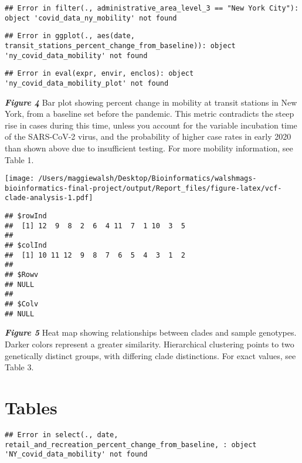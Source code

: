 \documentclass[
]{article}
\begin{document}
\begin{verbatim}
## Error in filter(., administrative_area_level_3 == "New York City"): object 'covid_data_ny_mobility' not found
\end{verbatim}

\begin{verbatim}
## Error in ggplot(., aes(date, transit_stations_percent_change_from_baseline)): object 'ny_covid_data_mobility' not found
\end{verbatim}

\begin{verbatim}
## Error in eval(expr, envir, enclos): object 'ny_covid_data_mobility_plot' not found
\end{verbatim}

\textbf{\emph{Figure 4}} Bar plot showing percent change in mobility at
transit stations in New York, from a baseline set before the pandemic.
This metric contradicts the steep rise in cases during this time, unless
you account for the variable incubation time of the SARS-CoV-2 virus,
and the probability of higher case rates in early 2020 than shown above
due to insufficient testing. For more mobility information, see Table 1.

\texttt{[image: /Users/maggiewalsh/Desktop/Bioinformatics/walshmags-bioinformatics-final-project/output/Report\_files/figure-latex/vcf-clade-analysis-1.pdf]}

\begin{verbatim}
## $rowInd
##  [1] 12  9  8  2  6  4 11  7  1 10  3  5
## 
## $colInd
##  [1] 10 11 12  9  8  7  6  5  4  3  1  2
## 
## $Rowv
## NULL
## 
## $Colv
## NULL
\end{verbatim}

\textbf{\emph{Figure 5}} Heat map showing relationships between clades
and sample genotypes. Darker colors represent a greater similarity.
Hierarchical clustering points to two genetically distinct groups, with
differing clade distinctions. For exact values, see Table 3.

\hypertarget{tables}{%
\section{Tables}\label{tables}}

\begin{verbatim}
## Error in select(., date, retail_and_recreation_percent_change_from_baseline, : object 'NY_covid_data_mobility' not found
\end{verbatim}
\end{document}
